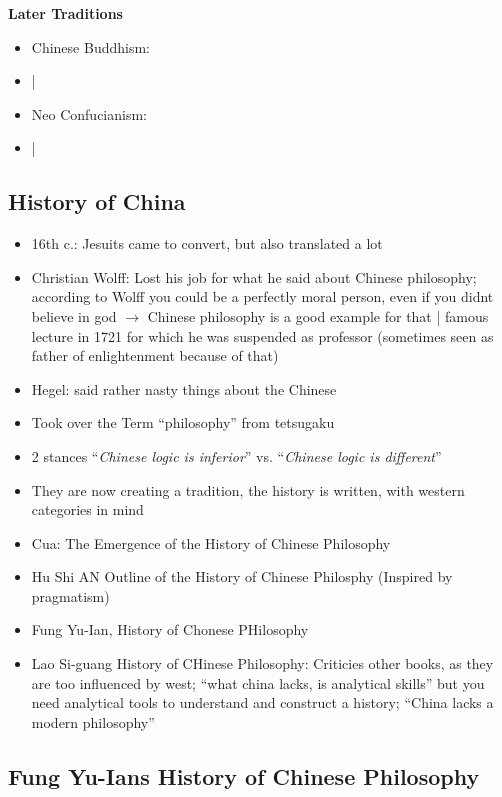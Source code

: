 \documentclass[emulatestandardclasses]{scrartcl}
\begin{document}
\textbf{Later Traditions}

\begin{itemize}
  \item Chinese Buddhism:
  \item |
  \item Neo Confucianism:
  \item |
\end{itemize}

\subsection{History of China}

\begin{itemize}
  \item 16th c.: Jesuits came to convert, but also translated a lot
  \item Christian Wolff: Lost his job for what he said about Chinese philosophy; according to Wolff you could be a perfectly moral person, even if you didnt believe in god $\rightarrow$ Chinese philosophy is a good example for that | famous lecture in 1721 for which he was suspended as professor (sometimes seen as father of enlightenment because of that)
  \item Hegel: said rather nasty things about the Chinese
  \item Took over the Term "`philosophy"' from tetsugaku
  \item 2 stances "`\emph{Chinese logic is inferior}"' vs. "`\emph{Chinese logic is different}"'
  \item They are now creating a tradition, the history is written, with western categories in mind
  \item Cua: The Emergence of the History of Chinese Philosophy
  \item Hu Shi AN Outline of the History of Chinese Philosphy (Inspired by pragmatism)
  \item Fung Yu-Ian, History of Chonese PHilosophy
  \item Lao Si-guang History of CHinese Philosophy: Criticies other books, as they are too influenced by west;  "`what china lacks, is analytical skills"' but you need analytical tools to understand and construct a history; "`China lacks a modern philosophy"'
\end{itemize}


\subsection{Fung Yu-Ians History of Chinese Philosophy}
\end{document}
